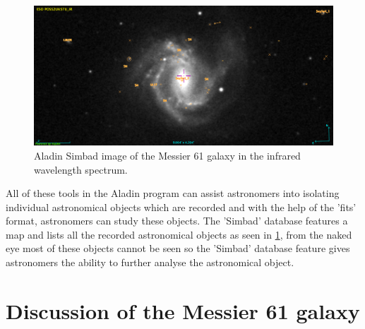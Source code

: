 \documentclass[12pt]{article}
\begin{document}
\begin{figure}[H]
\centering
\includegraphics[scale=0.45]{Images/As_Images/M61Simbad.png}
\caption{Aladin Simbad image of the Messier 61 galaxy in the infrared wavelength spectrum.}
\label{Aladin Simbad image of the Messier 61 galaxy}
\end{figure}

All of these tools in the Aladin program can assist astronomers into isolating individual astronomical objects which are recorded and with the help of the 'fits' format, astronomers can study these objects. The 'Simbad' database features a map and lists all the recorded astronomical objects as seen in \cref{Aladin Simbad image of the Messier 61 galaxy}, from the naked eye most of these objects cannot be seen so the 'Simbad' database feature gives astronomers the ability to further analyse the astronomical object. 

\section{Discussion of the Messier 61 galaxy}
\label{Section 4}
\end{document}
